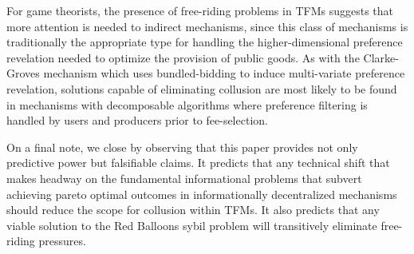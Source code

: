 \documentclass[oneside]{article}   	%
\begin{document}
For game theorists, the presence of free-riding problems in TFMs suggests that more attention is needed to indirect mechanisms, since this class of mechanisms is traditionally the appropriate type for handling the higher-dimensional preference revelation needed to optimize the provision of public goods. As with the Clarke-Groves mechanism which uses bundled-bidding to induce multi-variate preference revelation, solutions capable of eliminating collusion are most likely to be found in mechanisms with decomposable algorithms where preference filtering is handled by users and producers prior to fee-selection.

On a final note, we close by observing that this paper provides not only predictive power but falsifiable claims. It predicts that any technical shift that makes headway on the fundamental informational problems that subvert achieving pareto optimal outcomes in informationally decentralized mechanisms should reduce the scope for collusion within TFMs. It also predicts that any viable solution to the Red Balloons sybil problem will transitively eliminate free-riding pressures.

\cleardoublepage

\end{document}
